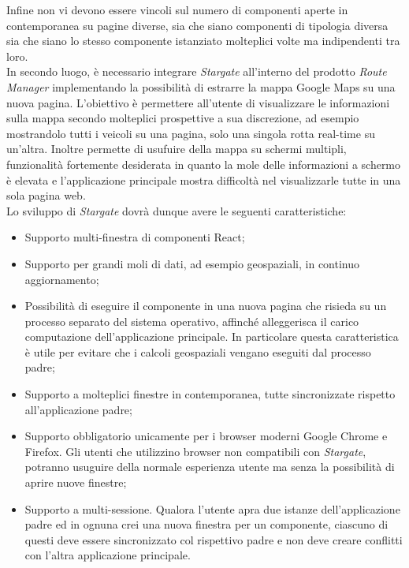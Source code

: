 Infine non vi devono essere vincoli sul numero di componenti aperte in contemporanea su pagine diverse, sia che siano componenti di tipologia diversa sia che siano lo stesso componente istanziato molteplici volte ma indipendenti tra loro.\\

In secondo luogo, è necessario integrare \textit{Stargate} all'interno del prodotto \textit{Route Manager} implementando la possibilità di estrarre la mappa Google Maps su una nuova pagina. L'obiettivo è permettere all'utente di visualizzare le informazioni sulla mappa secondo molteplici prospettive a sua discrezione, ad esempio mostrandolo tutti i veicoli su una pagina, solo una singola rotta real-time su un'altra. Inoltre permette di usufuire della mappa su schermi multipli, funzionalità fortemente desiderata in quanto la mole delle informazioni a schermo è elevata e l'applicazione principale mostra difficoltà nel visualizzarle tutte in una sola pagina web.\\

Lo sviluppo di \textit{Stargate} dovrà dunque avere le seguenti caratteristiche:

\begin{itemize}
    \item Supporto multi-finestra di componenti React;
    \item Supporto per grandi moli di dati, ad esempio geospaziali, in continuo aggiornamento;
    \item Possibilità di eseguire il componente in una nuova pagina che risieda su un processo separato del sistema operativo, affinché alleggerisca il carico computazione dell'applicazione principale. In particolare questa caratteristica è utile per evitare che i calcoli geospaziali vengano eseguiti dal processo padre;
    \item Supporto a molteplici finestre in contemporanea, tutte sincronizzate rispetto all'applicazione padre;
    \item Supporto obbligatorio unicamente per i browser moderni Google Chrome e Firefox. Gli utenti che utilizzino browser non compatibili con \textit{Stargate}, potranno usuguire della normale esperienza utente ma senza la possibilità di aprire nuove finestre;
    \item Supporto a multi-sessione. Qualora l'utente apra due istanze dell'applicazione padre ed in ognuna crei una nuova finestra per un componente, ciascuno di questi deve essere sincronizzato col rispettivo padre e non deve creare conflitti con l'altra applicazione principale.
\end{itemize}

